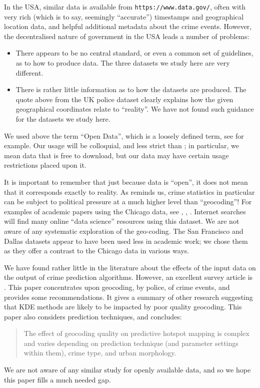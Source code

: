 \documentclass[twoside,a4paper,twocolumn,10pt]{article}
\theoremstyle{plain}
\theoremstyle{definition}
\begin{document}
In the USA, similar data is available from \texttt{https://www.data.gov/}, often with very
rich (which is to say, seemingly ``accurate'') timestamps and geographical location data,
and helpful additional metadata about the crime events.  However,
the decentralised nature of government in the USA leads a number of problems:
\begin{itemize}
\item There appears to be no central standard, or even a common set of guidelines,
  as to how to produce data.  The three datasets we study here are very different.
\item There is rather little information as to how the datasets are produced.  The quote
  above from the UK police dataset clearly explains how the given geographical coordinates
  relate to ``reality''.  We have not found such guidance for the datasets we study here.
\end{itemize}

We used above the term ``Open Data'', which is a loosely defined term, see \cite{odi}
for example.  Our usage will be colloquial, and less strict than \cite{odi}; in particular,
we mean data that is free to download, but our data may have certain usage restrictions
placed upon it.

It is important to remember that just because data is ``open'', it does not mean that it
corresponds exactly to reality.  As \cite{econ1} reminds us, crime statistics in particular
can be subject to political pressure at a much higher level than ``geocoding''!
For examples of academic papers using the Chicago data, see \cite{eftelioglu}, \cite{rosser_sepp},
\cite{hlo}.  Internet searches will find many online ``data science'' resources using this
dataset.  We are not aware of any systematic exploration of the geo-coding.  The San Francisco
and Dallas datasets appear to have been used less in academic work; we chose them as they offer
a contrast to the Chicago data in various ways.

We have found rather little in the literature about the effects of the input data on
the output of crime prediction algorithms.  However, an excellent survey article is \cite{HZ}.
This paper
concentrates upon geocoding, by police, of crime events, and provides some recommendations.
It gives a summary of other research suggesting that KDE methods are likely to be impacted by
poor quality geocoding.  This paper also considers prediction techniques, and concludes:
\begin{quote}
The effect of geocoding quality on predictive hotspot mapping is complex and varies depending on prediction
technique (and parameter settings within them), crime type, and urban morphology.
\end{quote}
We are not aware of any similar study for openly available data, and so we hope this
paper fills a much needed gap.
\end{document}
